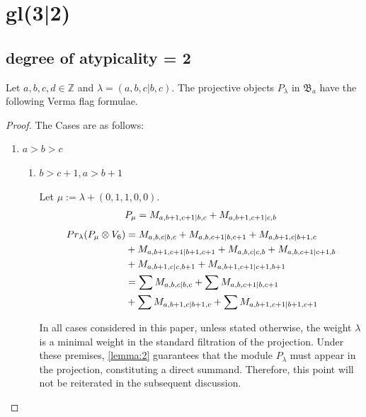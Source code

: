 
\section{gl(3|2)}
\subsection{degree of atypicality = 2}

\begin{theorem}
  Let $a,b,c,d \in \mathbb{Z}$ and $\lambda = (a,b,c|b,c)$. The projective objects $P_{\lambda}$ in $\mathfrak{B}_{a}$ have the following Verma flag formulae.
\end{theorem}
\begin{proof} The Cases are as follows:\par
\begin{enumerate}
  \item $a>b>c$
    \begin{enumerate}
      \item $b>c+1 ,a>b+1$ \par
        Let $\mu:=\lambda + (0,1,1,0,0) $. 
        \begin{equation}\notag
          \begin{aligned}
            P_{\mu} = M_{a,b+1,c+1|b,c}
+M_{a,b+1,c+1|c,b}
          \end{aligned}
        \end{equation}
        \begin{equation}\notag
          \begin{aligned}
            Pr_{\lambda}(P_\mu \otimes V_6) &= 
M_{a,b,c|b,c}
+M_{a,b,c+1|b,c+1}
+M_{a,b+1,c|b+1,c}\\
                                            &
+M_{a,b+1,c+1|b+1,c+1}
+M_{a,b,c|c,b}
+M_{a,b,c+1|c+1,b}\\
                                            &
+M_{a,b+1,c|c,b+1}
+M_{a,b+1,c+1|c+1,b+1} \\
                                            &=
\sum M_{a,b,c|b,c}
+\sum M_{a,b,c+1|b,c+1}\\
                                            &
+\sum M_{a,b+1,c|b+1,c}
+\sum M_{a,b+1,c+1|b+1,c+1}
          \end{aligned}
        \end{equation} 

In all cases considered in this paper, unless stated otherwise, the weight $\lambda$ is a minimal weight in the standard filtration of the projection. Under these premises, \cref{lemma:2} guarantees that the module $P_\lambda$ must appear in the projection, constituting a direct summand. Therefore, this point will not be reiterated in the subsequent discussion. 


\end{enumerate}
\end{enumerate}
\end{proof}
